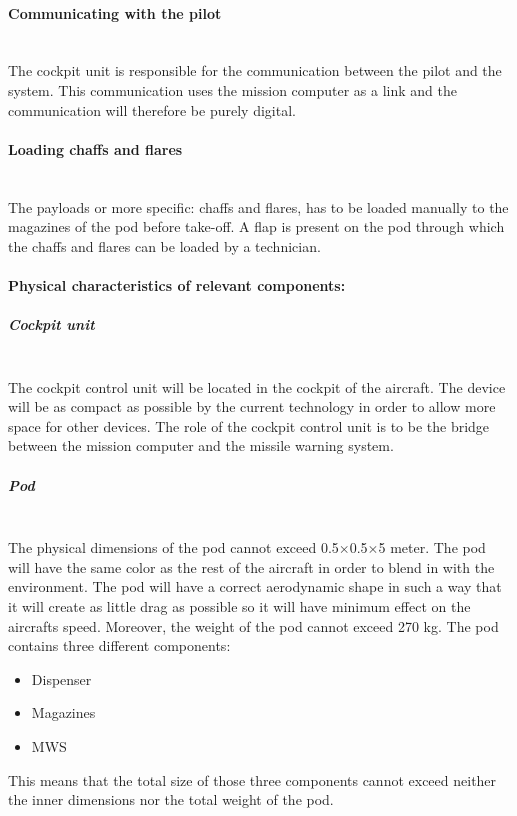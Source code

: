 \paragraph{Communicating with the pilot}  \makebox{} \\
The cockpit unit is responsible for the communication between the pilot and the system. This communication uses the mission computer as a link and the communication will therefore be purely digital.

\paragraph{Loading chaffs and flares}  \makebox{} \\
The payloads or more specific: chaffs and flares, has to be loaded manually to the magazines of the pod before take-off. A flap is present on the pod through which the chaffs and flares can be loaded by a technician.

\paragraph{Physical characteristics of relevant components:} 

\subparagraph{Cockpit unit}  \makebox{} \\
The cockpit control unit will be located in the cockpit of the aircraft. The device will be as compact as possible by the current technology in order to allow more space for other devices. The role of the cockpit control unit is to be the bridge between the mission computer and the missile warning system.

\subparagraph{Pod}  \makebox{} \\
The physical dimensions of the pod cannot exceed 0.5$\times$0.5$\times$5 meter. The pod will have the same color as the rest of the aircraft in order to blend in with the environment. The pod will have a correct aerodynamic shape in such a way that it will create as little drag as possible so it will have minimum effect on the aircrafts speed.  Moreover, the weight of the pod cannot exceed 270 kg.
The pod contains three different components:
\begin{itemize}
\item Dispenser
\item Magazines
\item MWS
\end{itemize}

This means that the total size of those three components cannot exceed neither the inner dimensions nor the total weight of the pod. 

